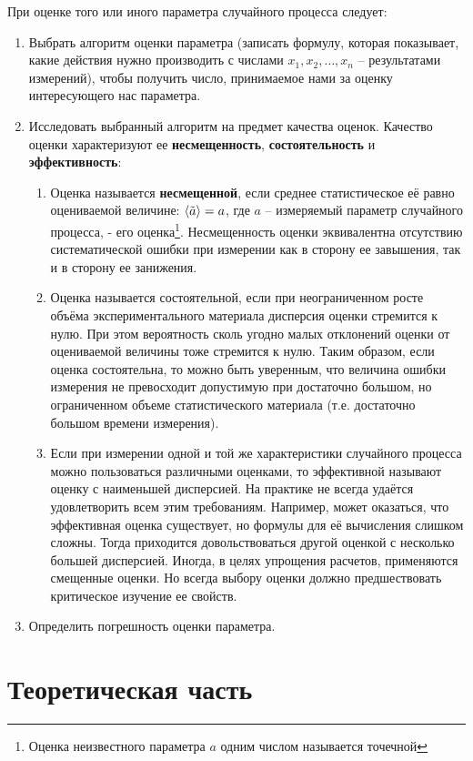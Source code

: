 При оценке того или иного параметра случайного процесса следует:
\begin{enumerate}
	\item Выбрать алгоритм оценки параметра (записать формулу, которая показывает, какие действия нужно производить с числами $x_{1},x_{2},\dots,x_n$ -- результатами измерений), чтобы получить число, принимаемое нами за оценку интересующего нас параметра.
	\item Исследовать выбранный алгоритм на предмет качества оценок. Качество оценки характеризуют ее \textbf{несмещенность}, \textbf{состоятельность} и \textbf{эффективность}:
	\begin{enumerate}
		\item Оценка называется \textbf{несмещенной}, если среднее статистическое её равно оцениваемой величине:  $\langle\tilde a\rangle = a$, где $a$ -- измеряемый параметр случайного процесса,  - его оценка\footnote{Оценка неизвестного параметра $a$ одним числом называется точечной}. Несмещенность оценки эквивалентна отсутствию систематической ошибки при измерении как в сторону ее завышения, так и в сторону ее занижения.
		\item Оценка называется состоятельной, если при неограниченном росте объёма экспериментального материала дисперсия оценки стремится к нулю. При этом вероятность сколь угодно малых отклонений оценки от оцениваемой величины тоже стремится к нулю. Таким образом, если оценка состоятельна, то можно быть уверенным, что величина ошибки измерения не превосходит допустимую при достаточно большом, но ограниченном объеме статистического материала (т.е. достаточно большом времени измерения).
		\item Если при измерении одной и той же характеристики случайного процесса можно пользоваться различными оценками, то эффективной называют оценку с наименьшей дисперсией. На практике не всегда удаётся удовлетворить всем этим требованиям. Например, может оказаться, что эффективная оценка существует, но формулы для её вычисления слишком сложны. Тогда приходится довольствоваться другой оценкой с несколько большей дисперсией. Иногда, в целях упрощения расчетов, применяются смещенные оценки. Но всегда выбору оценки должно предшествовать критическое изучение ее свойств.
	\end{enumerate}
	\item Определить погрешность оценки параметра. 
\end{enumerate}
\section{Теоретическая часть}%
